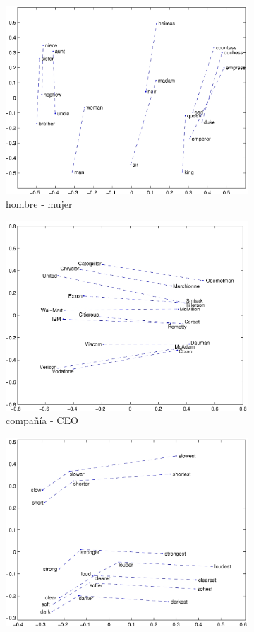 \begin{itemize}
\begin{itemize}
		\begin{figure}[!ht]
			\centering
			\small
			\begin{subfigure}{.55\textwidth}
				\centering
				\includegraphics[width=0.85\linewidth]{2/figures/glove_man-woman.jpg}
				\caption{hombre - mujer}
			\end{subfigure}%
			\begin{subfigure}{.55\textwidth}
				\centering
				\includegraphics[width=0.85\linewidth]{2/figures/glove_company-ceo.jpg}
				\caption{compañía - CEO}
			\end{subfigure}
			\begin{subfigure}{.55\textwidth}
				\centering
				\includegraphics[width=0.85\linewidth]{2/figures/glove_comparative-superlative.jpg}

\end{subfigure}
\end{figure}
\end{itemize}
\end{itemize}
